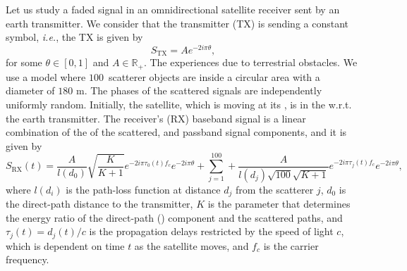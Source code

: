 \documentclass{article}
\begin{document}
Let us study a faded signal in an omnidirectional satellite receiver sent by an earth transmitter. We consider that the transmitter (TX) is sending a constant  symbol, \textit{i.e.}, the TX  is given by
\begin{equation}
  S_{\text{TX}} = Ae^{-2 i \pi \theta},  \tag{$1$}
\end{equation}
for some $\theta \in [0,1]$ and $A \in \mathbb{R}_+$. The  experiences  due to terrestrial obstacles. We use a model where $100$ scatterer objects are  inside a circular area with a diameter of $180$ m. The phases of the scattered signals are independently uniformly random. Initially, the satellite, which is moving at its , is in the  w.r.t. the earth transmitter. The receiver's (RX) baseband signal is a linear combination of the  of the scattered,  and  passband signal components, and it is given by
\begin{equation}
  S_{\text{RX}}(t) = \frac{A}{l(d_0)} \sqrt{\frac{K}{K+1}}e^{-2 i \pi \tau_0(t) f_c }e^{-2 i \pi \theta} + \sum_{j=1}^{100} + \frac{A
  }{l(d_j) \sqrt{100}\sqrt{K+1}} e^{-2 i \pi \tau_j(t) f_c }e^{-2 i \pi \theta}, \tag{2}
\end{equation}
where $l(d_i)$ is the path-loss function at distance $d_j$ from the scatterer $j$, $d_0$ is the direct-path distance to the transmitter, $K$ is the parameter that determines the energy ratio of the direct-path () component and the scattered paths, and $\tau_j(t) = d_j(t)/c$ is the propagation delays restricted by the speed of light $c$, which is dependent on time $t$ as the satellite moves, and $f_c$ is the carrier frequency.
\end{document}
